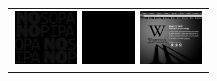 \documentclass{acm_proc_article-sp}
\newcommand{\thumbheight}{14mm}
\newcommand{\newstrip}{\newline\vspace{-1em}\newline}
\newenvironment{thumbsequence}{}{\makebox[4mm]{}}
\begin{document}
\begin{figure}
\begin{tabular}{p{\textwidth}}
	\begin{thumbsequence}
		\includegraphics[height=\thumbheight]{resources/sopa/looseduplicate7.png}
		\includegraphics[height=\thumbheight]{resources/sopa/looseduplicate8.jpg}
	\end{thumbsequence}
	\newstrip
	\begin{thumbsequence}
		\includegraphics[height=\thumbheight]{resources/sopa/looseduplicate9.png}

\end{thumbsequence}
\end{tabular}
\end{figure}
\end{document}
